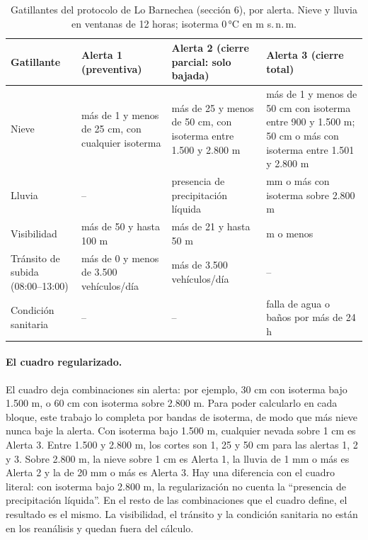 \documentclass[11pt,a4paper]{article}
\begin{document}
\begin{table}[H]
\centering\footnotesize\setlength{\tabcolsep}{4pt}
\caption{Gatillantes del protocolo de Lo Barnechea (sección 6), por alerta. Nieve y lluvia en ventanas de 12 horas; isoterma 0\,°C en m s.\,n.\,m.}
\label{tab:cuadro}
\begin{tabularx}{\textwidth}{|>{\raggedright\arraybackslash}p{1.9cm}|>{\raggedright\arraybackslash}X|>{\raggedright\arraybackslash}X|>{\raggedright\arraybackslash}X|}
\hline
Gatillante & Alerta 1 (preventiva) & Alerta 2 (cierre parcial: solo bajada) & Alerta 3 (cierre total) \\ \hline
Nieve & más de 1 y menos de 25 cm, con cualquier isoterma & más de 25 y menos de 50 cm, con isoterma entre 1.500 y 2.800 m & más de 1 y menos de 50 cm con isoterma entre 900 y 1.500 m; 50 cm o más con isoterma entre 1.501 y 2.800 m \\ \hline
Lluvia & -- & presencia de precipitación líquida & 20 mm o más con isoterma sobre 2.800 m \\ \hline
Visibilidad & más de 50 y hasta 100 m & más de 21 y hasta 50 m & 20 m o menos \\ \hline
Tránsito de subida (08:00--13:00) & más de 0 y menos de 3.500 vehículos/día & más de 3.500 vehículos/día & -- \\ \hline
Condición sanitaria & -- & -- & falla de agua o baños por más de 24 h \\ \hline
\end{tabularx}
\end{table}

\paragraph{El cuadro regularizado.} El cuadro deja combinaciones sin alerta: por ejemplo, 30 cm con isoterma bajo 1.500 m, o 60 cm con isoterma sobre 2.800 m. Para poder calcularlo en cada bloque, este trabajo lo completa por bandas de isoterma, de modo que más nieve nunca baje la alerta. Con isoterma bajo 1.500 m, cualquier nevada sobre 1 cm es Alerta 3. Entre 1.500 y 2.800 m, los cortes son 1, 25 y 50 cm para las alertas 1, 2 y 3. Sobre 2.800 m, la nieve sobre 1 cm es Alerta 1, la lluvia de 1 mm o más es Alerta 2 y la de 20 mm o más es Alerta 3. Hay una diferencia con el cuadro literal: con isoterma bajo 2.800 m, la regularización no cuenta la ``presencia de precipitación líquida''. En el resto de las combinaciones que el cuadro define, el resultado es el mismo. La visibilidad, el tránsito y la condición sanitaria no están en los reanálisis y quedan fuera del cálculo.
\end{document}
